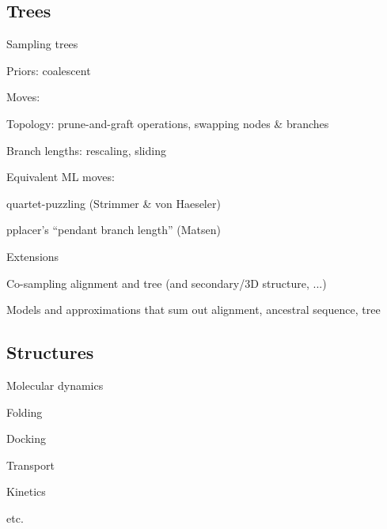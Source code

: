 \documentclass{beamer}
\begin{document}
\subsection{Trees}

\begin{frame}{Sampling trees}

\itemb
\item Priors: coalescent
\item Moves:
\itemb
\item Topology: prune-and-graft operations, swapping nodes \& branches
\item Branch lengths: rescaling, sliding
\iteme
\item Equivalent ML moves:
\itemb
\item quartet-puzzling (Strimmer \& von Haeseler)
\item pplacer's ``pendant branch length'' (Matsen)
\iteme
\iteme

\end{frame}

\begin{frame}{Extensions}

\itemb
\item Co-sampling alignment and tree (and secondary/3D structure, ...)
\item Models and approximations that sum out alignment, ancestral sequence, tree
\iteme

\end{frame}


\subsection{Structures}

\begin{frame}{Molecular dynamics}

\itemb
\item Folding
\item Docking
\item Transport
\item Kinetics
\item etc.
\iteme

\end{frame}
\end{document}
